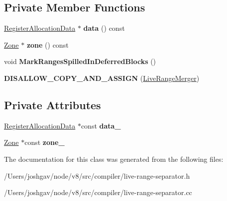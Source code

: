 \subsection*{Private Member Functions}
\begin{DoxyCompactItemize}
\item 
\hyperlink{classv8_1_1internal_1_1compiler_1_1_register_allocation_data}{Register\+Allocation\+Data} $\ast$ {\bfseries data} () const \hypertarget{classv8_1_1internal_1_1compiler_1_1_live_range_merger_a43225c3bfd827f475fe10e07577af1c3}{}\label{classv8_1_1internal_1_1compiler_1_1_live_range_merger_a43225c3bfd827f475fe10e07577af1c3}

\item 
\hyperlink{classv8_1_1internal_1_1_zone}{Zone} $\ast$ {\bfseries zone} () const \hypertarget{classv8_1_1internal_1_1compiler_1_1_live_range_merger_a37db004e43bb7bf037a7b26f9ee70fc4}{}\label{classv8_1_1internal_1_1compiler_1_1_live_range_merger_a37db004e43bb7bf037a7b26f9ee70fc4}

\item 
void {\bfseries Mark\+Ranges\+Spilled\+In\+Deferred\+Blocks} ()\hypertarget{classv8_1_1internal_1_1compiler_1_1_live_range_merger_a7371720e0cd0c588322af574b32a0f28}{}\label{classv8_1_1internal_1_1compiler_1_1_live_range_merger_a7371720e0cd0c588322af574b32a0f28}

\item 
{\bfseries D\+I\+S\+A\+L\+L\+O\+W\+\_\+\+C\+O\+P\+Y\+\_\+\+A\+N\+D\+\_\+\+A\+S\+S\+I\+GN} (\hyperlink{classv8_1_1internal_1_1compiler_1_1_live_range_merger}{Live\+Range\+Merger})\hypertarget{classv8_1_1internal_1_1compiler_1_1_live_range_merger_a6e38be7537aec0d128b61f57a7946925}{}\label{classv8_1_1internal_1_1compiler_1_1_live_range_merger_a6e38be7537aec0d128b61f57a7946925}

\end{DoxyCompactItemize}
\subsection*{Private Attributes}
\begin{DoxyCompactItemize}
\item 
\hyperlink{classv8_1_1internal_1_1compiler_1_1_register_allocation_data}{Register\+Allocation\+Data} $\ast$const {\bfseries data\+\_\+}\hypertarget{classv8_1_1internal_1_1compiler_1_1_live_range_merger_ad10d3673f063f3249651ae21f80c6187}{}\label{classv8_1_1internal_1_1compiler_1_1_live_range_merger_ad10d3673f063f3249651ae21f80c6187}

\item 
\hyperlink{classv8_1_1internal_1_1_zone}{Zone} $\ast$const {\bfseries zone\+\_\+}\hypertarget{classv8_1_1internal_1_1compiler_1_1_live_range_merger_a8a01c984bbc2ef9d28a6c7d5f0c2068e}{}\label{classv8_1_1internal_1_1compiler_1_1_live_range_merger_a8a01c984bbc2ef9d28a6c7d5f0c2068e}

\end{DoxyCompactItemize}


The documentation for this class was generated from the following files\+:\begin{DoxyCompactItemize}
\item 
/\+Users/joshgav/node/v8/src/compiler/live-\/range-\/separator.\+h\item 
/\+Users/joshgav/node/v8/src/compiler/live-\/range-\/separator.\+cc\end{DoxyCompactItemize}
